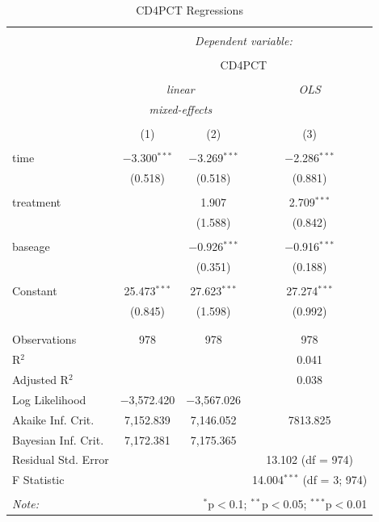 \documentclass[12pt]{article}
\begin{document}
{\begin{table}[!htbp] \centering 
  \caption{CD4PCT Regressions} 
  \label{} 
\begin{tabular}{@{\extracolsep{5pt}}lccc} 
\\[-1.8ex]\hline 
\hline \\[-1.8ex] 
 & \multicolumn{3}{c}{\textit{Dependent variable:}} \\ 
\cline{2-4} 
\\[-1.8ex] & \multicolumn{3}{c}{CD4PCT} \\ 
\\[-1.8ex] & \multicolumn{2}{c}{\textit{linear}} & \textit{OLS} \\ 
 & \multicolumn{2}{c}{\textit{mixed-effects}} & \textit{} \\ 
\\[-1.8ex] & (1) & (2) & (3)\\ 
\hline \\[-1.8ex] 
 time & $-$3.300$^{***}$ & $-$3.269$^{***}$ & $-$2.286$^{***}$ \\ 
  & (0.518) & (0.518) & (0.881) \\ 
  & & & \\ 
 treatment &  & 1.907 & 2.709$^{***}$ \\ 
  &  & (1.588) & (0.842) \\ 
  & & & \\ 
 baseage &  & $-$0.926$^{***}$ & $-$0.916$^{***}$ \\ 
  &  & (0.351) & (0.188) \\ 
  & & & \\ 
 Constant & 25.473$^{***}$ & 27.623$^{***}$ & 27.274$^{***}$ \\ 
  & (0.845) & (1.598) & (0.992) \\ 
  & & & \\ 
\hline \\[-1.8ex] 
Observations & 978 & 978 & 978 \\ 
R$^{2}$ &  &  & 0.041 \\ 
Adjusted R$^{2}$ &  &  & 0.038 \\ 
Log Likelihood & $-$3,572.420 & $-$3,567.026 &  \\ 
Akaike Inf. Crit. & 7,152.839 & 7,146.052 & 7813.825 \\ 
Bayesian Inf. Crit. & 7,172.381 & 7,175.365 &  \\ 
Residual Std. Error &  &  & 13.102 (df = 974) \\ 
F Statistic &  &  & 14.004$^{***}$ (df = 3; 974) \\ 
\hline 
\hline \\[-1.8ex] 
\textit{Note:}  & \multicolumn{3}{r}{$^{*}$p$<$0.1; $^{**}$p$<$0.05; $^{***}$p$<$0.01} \\ 
\end{tabular} 
\end{table} 

}
\end{document}
